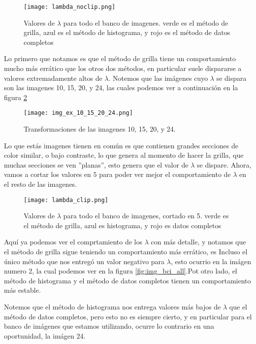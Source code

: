     \begin{figure}[H]
        \centering
        \texttt{[image: lambda\_noclip.png]}
        \caption{Valores de $\lambda$ para todo el banco de imagenes. verde es el m\'etodo de grilla, azul es el m\'etodo de histograma, y rojo es el m\'etodo de datos completos}
        \label{fig:lambda_noclip}
    \end{figure}

    Lo primero que notamos es que el m\'etodo de grilla tiene un comportamiento mucho m\'as err\'atico que los otros dos m\'etodos, en particular suele dispararse a valores extremadamente altos de $\lambda$. Notemos que las im\'agenes cuyo $\lambda$ se dispara son las imagenes 10, 15, 20, y 24, las cuales podemos ver a continuaci\'on en la figura \ref{fig:img_bci_10_15_20}

    \begin{figure}[H]
        \centering
        \texttt{[image: img\_ex\_10\_15\_20\_24.png]}
        \caption{Transformaciones de las imagenes 10, 15, 20, y 24.}
        \label{fig:img_bci_10_15_20}
    \end{figure}

    Lo que est\'as imagenes tienen en com\'un es que contienen grandes secciones de color similar, o bajo contraste, lo que genera al momento de hacer la grilla, que muchas secciones se ven ''planas'', esto genera que el valor de $\lambda$ se dispare. Ahora, vamos a cortar los valores en $5$ para poder ver mejor el comportamiento de $\lambda$ en el resto de las imagenes.

    \begin{figure}[H]
        \centering
        \texttt{[image: lambda\_clip.png]}
        \caption{Valores de $\lambda$ para todo el banco de imagenes, cortado en 5. verde es el m\'etodo de grilla, azul es histograma, y rojo es datos completos}
        \label{fig:lambda_clip}
    \end{figure}

    Aqu\'i ya podemos ver el comprtamiento de los $\lambda$ con m\'as detalle, y notamos que el m\'etodo de grilla sigue teniendo un comportamiento m\'as err\'atico, es Incluso el \'unico m\'etodo que nos entreg\'o un valor negativo para $\lambda$, esto ocurrio en la im\'agen numero 2, la cual podemos ver en la figura \ref{fig:img_bci_all}.Pot otro lado, el m\'etodo de histograma y el m\'etodo de datos completos tienen un comportamiento m\'as estable. 
    
    Notemos que el m\'etodo de histograma nos entrega valores m\'as bajos de $\lambda$ que el m\'etodo de datos completos, pero esto no es siempre cierto, y en particular para el banco de im\'agenes que estamos utilizando, ocurre lo contrario en una oportunidad, la im\'agen 24.

